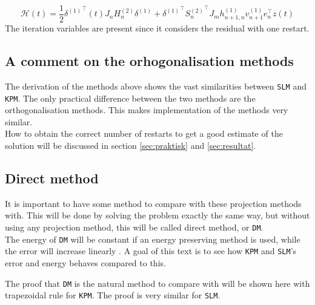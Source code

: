 \begin{equation}
\mathcal{H} (t) = \frac{1}{2} {\delta^{(1)}}^\top (t) J_n H_n^{(2)} \delta^{(1)} + {\delta^{(1)}}^\top {S_n^{(2)}}^\top  J_m h_{n+1,n}^{(1)} v_{n+1}^{(1)} e_n^\top z(t)
\label{eqn:energy4}
\end{equation}
The iteration variables are present since it considers the residual with one restart.

\subsection{A comment on the orhogonalisation methods} %
The  derivation of the methods above shows the vast similarities between \texttt{SLM} and \texttt{KPM}. The only practical difference between the two methods are the orthogonalisation methods. This makes implementation of the methods very similar.  \\

How to obtain the correct number of restarts to get a good estimate of the solution will be discussed in section \ref{sec:praktisk} and \ref{sec:resultat}.

\subsection{Direct method} \label{sec:DM}
It is important to have some method to compare with these projection methods with. This will be done by solving the problem exactly the same way, but without using any projection method, this will be called direct method, or \texttt{DM}. \\

The energy of \texttt{DM} will be constant if an energy preserving method is used, while the error will increase linearly \cite{linearerrorgrowth}. A goal of this text is to see how \texttt{KPM} and \texttt{SLM}'s error and energy behaves compared to this. 

The proof that \texttt{DM} is the natural method to compare with will be shown here with trapezoidal rule for \texttt{KPM}. The proof is very similar for \texttt{SLM}. \\

